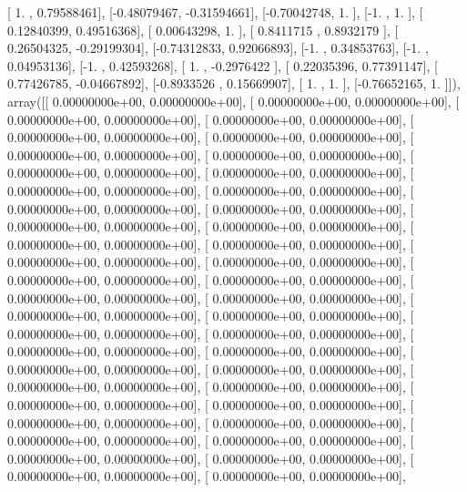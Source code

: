 \documentclass{article}
\begin{document}
       [ 1.        ,  0.79588461],
       [-0.48079467, -0.31594661],
       [-0.70042748,  1.        ],
       [-1.        ,  1.        ],
       [ 0.12840399,  0.49516368],
       [ 0.00643298,  1.        ],
       [ 0.8411715 ,  0.8932179 ],
       [ 0.26504325, -0.29199304],
       [-0.74312833,  0.92066893],
       [-1.        ,  0.34853763],
       [-1.        ,  0.04953136],
       [-1.        ,  0.42593268],
       [ 1.        , -0.2976422 ],
       [ 0.22035396,  0.77391147],
       [ 0.77426785, -0.04667892],
       [-0.8933526 ,  0.15669907],
       [ 1.        ,  1.        ],
       [-0.76652165,  1.        ]]), array([[  0.00000000e+00,   0.00000000e+00],
       [  0.00000000e+00,   0.00000000e+00],
       [  0.00000000e+00,   0.00000000e+00],
       [  0.00000000e+00,   0.00000000e+00],
       [  0.00000000e+00,   0.00000000e+00],
       [  0.00000000e+00,   0.00000000e+00],
       [  0.00000000e+00,   0.00000000e+00],
       [  0.00000000e+00,   0.00000000e+00],
       [  0.00000000e+00,   0.00000000e+00],
       [  0.00000000e+00,   0.00000000e+00],
       [  0.00000000e+00,   0.00000000e+00],
       [  0.00000000e+00,   0.00000000e+00],
       [  0.00000000e+00,   0.00000000e+00],
       [  0.00000000e+00,   0.00000000e+00],
       [  0.00000000e+00,   0.00000000e+00],
       [  0.00000000e+00,   0.00000000e+00],
       [  0.00000000e+00,   0.00000000e+00],
       [  0.00000000e+00,   0.00000000e+00],
       [  0.00000000e+00,   0.00000000e+00],
       [  0.00000000e+00,   0.00000000e+00],
       [  0.00000000e+00,   0.00000000e+00],
       [  0.00000000e+00,   0.00000000e+00],
       [  0.00000000e+00,   0.00000000e+00],
       [  0.00000000e+00,   0.00000000e+00],
       [  0.00000000e+00,   0.00000000e+00],
       [  0.00000000e+00,   0.00000000e+00],
       [  0.00000000e+00,   0.00000000e+00],
       [  0.00000000e+00,   0.00000000e+00],
       [  0.00000000e+00,   0.00000000e+00],
       [  0.00000000e+00,   0.00000000e+00],
       [  0.00000000e+00,   0.00000000e+00],
       [  0.00000000e+00,   0.00000000e+00],
       [  0.00000000e+00,   0.00000000e+00],
       [  0.00000000e+00,   0.00000000e+00],
       [  0.00000000e+00,   0.00000000e+00],
       [  0.00000000e+00,   0.00000000e+00],
       [  0.00000000e+00,   0.00000000e+00],
       [  0.00000000e+00,   0.00000000e+00],
       [  0.00000000e+00,   0.00000000e+00],
       [  0.00000000e+00,   0.00000000e+00],
       [  0.00000000e+00,   0.00000000e+00],
       [  0.00000000e+00,   0.00000000e+00],
       [  0.00000000e+00,   0.00000000e+00],
       [  0.00000000e+00,   0.00000000e+00],
\end{document}
